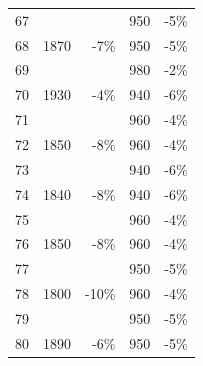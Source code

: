 \documentclass{scrartcl}
\begin{document}
\begin{longtable}{|r|l|r|r|r|}
    67    &       &       & 950   & -5\% \\
    68    & 1870  & \cellcolor[rgb]{ 1,  .922,  .612}\textcolor[rgb]{ .612,  .341,  0}{-7\%} & 950   & -5\% \\
    69    &       &       & 980   & -2\% \\
    70    & 1930  & -4\%  & 940   & \cellcolor[rgb]{ 1,  .922,  .612}\textcolor[rgb]{ .612,  .341,  0}{-6\%} \\
    71    &       &       & 960   & -4\% \\
    72    & 1850  & \cellcolor[rgb]{ 1,  .922,  .612}\textcolor[rgb]{ .612,  .341,  0}{-8\%} & 960   & -4\% \\
    73    &       &       & 940   & \cellcolor[rgb]{ 1,  .922,  .612}\textcolor[rgb]{ .612,  .341,  0}{-6\%} \\
    74    & 1840  & \cellcolor[rgb]{ 1,  .922,  .612}\textcolor[rgb]{ .612,  .341,  0}{-8\%} & 940   & \cellcolor[rgb]{ 1,  .922,  .612}\textcolor[rgb]{ .612,  .341,  0}{-6\%} \\
    75    &       &       & 960   & -4\% \\
    76    & 1850  & \cellcolor[rgb]{ 1,  .922,  .612}\textcolor[rgb]{ .612,  .341,  0}{-8\%} & 960   & -4\% \\
    77    &       &       & 950   & -5\% \\
    78    & 1800  & \cellcolor[rgb]{ 1,  .922,  .612}\textcolor[rgb]{ .612,  .341,  0}{-10\%} & 960   & -4\% \\
    79    &       &       & 950   & -5\% \\
    80    & 1890  & -6\%  & 950   & -5\% \\
\end{longtable}
\pagebreak
\end{document}
